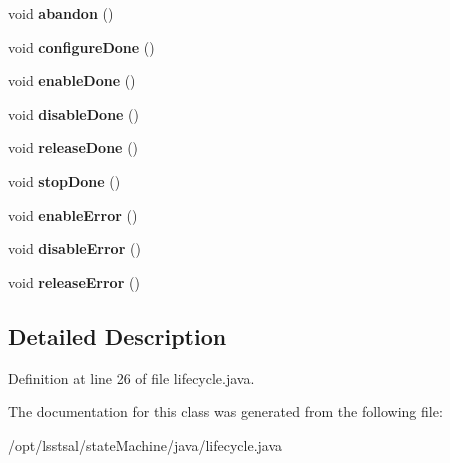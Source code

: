 \begin{DoxyCompactItemize}
\item 
\hypertarget{classsal__mount_lifecycle_a493bac9cf4e2e7b24c3cc83cbdc8dc09}{void {\bfseries abandon} ()}\label{classsal__mount_lifecycle_a493bac9cf4e2e7b24c3cc83cbdc8dc09}

\item 
\hypertarget{classsal__mount_lifecycle_adeab3a052b9d1cfab3450cbd7811291c}{void {\bfseries configure\-Done} ()}\label{classsal__mount_lifecycle_adeab3a052b9d1cfab3450cbd7811291c}

\item 
\hypertarget{classsal__mount_lifecycle_ac9b0f70ab4e6bf0c6497b78d2d9e6ed9}{void {\bfseries enable\-Done} ()}\label{classsal__mount_lifecycle_ac9b0f70ab4e6bf0c6497b78d2d9e6ed9}

\item 
\hypertarget{classsal__mount_lifecycle_a2c3f820260ce9a7b4bf51576145b0c35}{void {\bfseries disable\-Done} ()}\label{classsal__mount_lifecycle_a2c3f820260ce9a7b4bf51576145b0c35}

\item 
\hypertarget{classsal__mount_lifecycle_acb1d423b64b64b07b203dbe4e969303e}{void {\bfseries release\-Done} ()}\label{classsal__mount_lifecycle_acb1d423b64b64b07b203dbe4e969303e}

\item 
\hypertarget{classsal__mount_lifecycle_aaed0aeb158b869c0ca7da37bd7310c39}{void {\bfseries stop\-Done} ()}\label{classsal__mount_lifecycle_aaed0aeb158b869c0ca7da37bd7310c39}

\item 
\hypertarget{classsal__mount_lifecycle_a0b47ad45c296249c66c9e804f739db3c}{void {\bfseries enable\-Error} ()}\label{classsal__mount_lifecycle_a0b47ad45c296249c66c9e804f739db3c}

\item 
\hypertarget{classsal__mount_lifecycle_ac8cd9a6eeb49a12894c720dbbd890f78}{void {\bfseries disable\-Error} ()}\label{classsal__mount_lifecycle_ac8cd9a6eeb49a12894c720dbbd890f78}

\item 
\hypertarget{classsal__mount_lifecycle_a6405e4e84264b5aee8ff325643b93c86}{void {\bfseries release\-Error} ()}\label{classsal__mount_lifecycle_a6405e4e84264b5aee8ff325643b93c86}

\end{DoxyCompactItemize}


\subsection{Detailed Description}


Definition at line 26 of file lifecycle.\-java.



The documentation for this class was generated from the following file\-:\begin{DoxyCompactItemize}
\item 
/opt/lsstsal/state\-Machine/java/lifecycle.\-java\end{DoxyCompactItemize}
